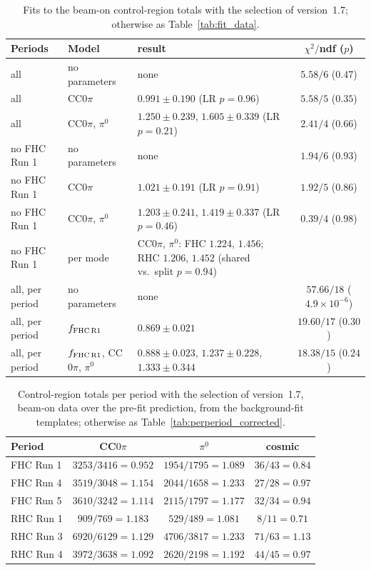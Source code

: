 \documentclass[11pt,a4paper]{article}
\begin{document}
\begin{table}[H]
  \centering
  \caption{Fits to the beam-on control-region totals with the selection of version~1.7; otherwise as
    Table~\ref{tab:fit_data}.}
  \label{tab:fit_braggfix}
  \footnotesize\setlength{\tabcolsep}{4pt}
  \begin{tabular}{llp{}c}
    \toprule
    Periods & Model & result & $\chi^2/$ndf ($p$) \\
    \midrule
    all & no parameters & none & $5.58/6$ ($0.47$) \\
    all & CC$0\pi$ & $0.991\pm0.190$ (LR $p=0.96$) & $5.58/5$ ($0.35$) \\
    all & CC$0\pi$, $\pi^0$ & $1.250\pm0.239$, $1.605\pm0.339$ (LR $p=0.21$) & $2.41/4$ ($0.66$) \\
    no FHC Run 1 & no parameters & none & $1.94/6$ ($0.93$) \\
    no FHC Run 1 & CC$0\pi$ & $1.021\pm0.191$ (LR $p=0.91$) & $1.92/5$ ($0.86$) \\
    no FHC Run 1 & CC$0\pi$, $\pi^0$ & $1.203\pm0.241$, $1.419\pm0.337$ (LR $p=0.46$) & $0.39/4$ ($0.98$) \\
    no FHC Run 1 & per mode & CC$0\pi$, $\pi^0$: FHC $1.224$, $1.456$; RHC $1.206$, $1.452$ (shared vs.\ split $p=0.94$) & \\
    all, per period & no parameters & none & $57.66/18$ ($4.9\times10^{-6}$) \\
    all, per period & $f_{\rm FHC\,R1}$ & $0.869\pm0.021$ & $19.60/17$ ($0.30$) \\
    all, per period & $f_{\rm FHC\,R1}$, CC$0\pi$, $\pi^0$ & $0.888\pm0.023$, $1.237\pm0.228$, $1.333\pm0.344$ & $18.38/15$ ($0.24$) \\
    \bottomrule
  \end{tabular}
\end{table}

\begin{table}[H]
  \centering
  \caption{Control-region totals per period with the selection of version~1.7, beam-on data over the pre-fit
    prediction, from the background-fit templates; otherwise as Table~\ref{tab:perperiod_corrected}.}
  \label{tab:perperiod_braggfix}
  \small
  \begin{tabular}{lccc}\toprule
    Period & CC$0\pi$ & $\pi^0$ & cosmic \\ \midrule
    FHC Run 1 & $3253/3416 = 0.952$ & $1954/1795 = 1.089$ & $36/43 = 0.84$ \\
    FHC Run 4 & $3519/3048 = 1.154$ & $2044/1658 = 1.233$ & $27/28 = 0.97$ \\
    FHC Run 5 & $3610/3242 = 1.114$ & $2115/1797 = 1.177$ & $32/34 = 0.94$ \\
    RHC Run 1 & $909/769 = 1.183$ & $529/489 = 1.081$ & $8/11 = 0.71$ \\
    RHC Run 3 & $6920/6129 = 1.129$ & $4706/3817 = 1.233$ & $71/63 = 1.13$ \\
    RHC Run 4 & $3972/3638 = 1.092$ & $2620/2198 = 1.192$ & $44/45 = 0.97$ \\
    \bottomrule
  \end{tabular}
\end{table}
\end{document}
